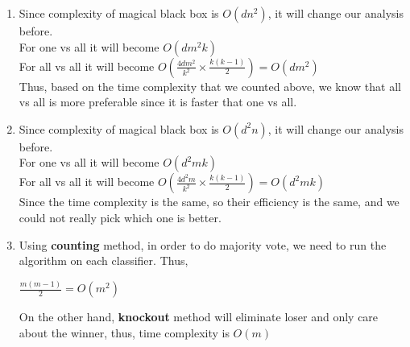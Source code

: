 \documentclass{article}
\begin{document}
\begin{enumerate}
\begin{enumerate}
   \item Since complexity of magical black box is $O(dn^2)$, it will change our analysis before. 
   \\For one vs all it will become $O(dm^2k)$
   \\For all vs all it will become $O(\frac{4dm^2}{k^2} \times \frac{k(k-1)}{2}) = O(dm^2)$  
   \\Thus, based on the time complexity that we counted above, we know that all vs all is more preferable since it is faster that one vs all. 
   \item Since complexity of magical black box is $O(d^2n)$, it will change our analysis before. 
   \\For one vs all it will become $O(d^2mk)$
   \\For all vs all it will become $O(\frac{4d^2m}{k^2} \times \frac{k(k-1)}{2}) = O(d^2mk)$  
   \\Since the time complexity is the same, so their efficiency is the same, and we could not really pick which one is better.
   \item Using \textbf{counting} method, in order to do majority vote, we need to run the algorithm on each classifier. Thus, 
   \begin{center}
       $\frac{m(m-1)}{2} = O(m^2)$
   \end{center}
   On the other hand, \textbf{knockout} method will eliminate loser and only care about the winner, thus, time complexity is $O(m)$
\end{enumerate}
\end{enumerate}%
\end{document}
